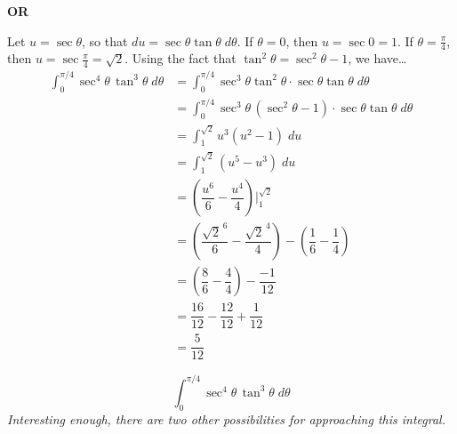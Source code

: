 \documentclass[12pt,letterpaper]{exam}
\begin{document}
\begin{questions}
{	\begin{center} {\bfseries OR} \end{center}

Let $u= \sec \theta$, so that $du= \sec \theta \tan \theta \;d\theta$. If $\theta= 0$, then $u= \sec 0= 1$. If $\theta= \frac{\pi}{4}$, then $u= \sec \frac{\pi}{4}= \sqrt{2}$. Using the fact that $\tan^2 \theta= \sec^2 \theta - 1$, we have\dots
	\[
	\begin{aligned}
	\int_0^{\pi/4} \sec^4 \theta \, \tan^3 \theta \;d\theta&= \int_0^{\pi/4} \sec^3 \theta \tan^2 \theta \cdot \sec \theta \tan \theta \;d\theta \\
	&= \int_0^{\pi/4} \sec^3 \theta \, (\sec^2 \theta - 1) \cdot \sec \theta \tan \theta \;d\theta \\
	&= \int_1^{\sqrt{2}} u^3 (u^2 - 1) \;du \\
	&= \int_1^{\sqrt{2}} (u^5 - u^3) \;du \\
	&= \left( \dfrac{u^6}{6} - \dfrac{u^4}{4} \right) \bigg|_1^{\sqrt{2}} \\
	&= \left( \dfrac{\sqrt{2}^{\,6}}{6} - \dfrac{\sqrt{2}^{\,4}}{4} \right) - \left( \dfrac{1}{6} - \dfrac{1}{4} \right) \\
	&= \left( \dfrac{8}{6} - \dfrac{4}{4} \right) - \dfrac{-1}{12} \\
	&= \dfrac{16}{12} - \dfrac{12}{12} + \dfrac{1}{12} \\
	&= \dfrac{5}{12}
	\end{aligned}
	\]
}

\newpage

{
\thispagestyle{empty}
\footnotesize \itshape
	\[
	\int_0^{\pi/4} \sec^4 \theta \, \tan^3 \theta \;d\theta
	\]
Interesting enough, there are two other possibilities for approaching this integral. \pspace

}
\end{questions}
\end{document}
